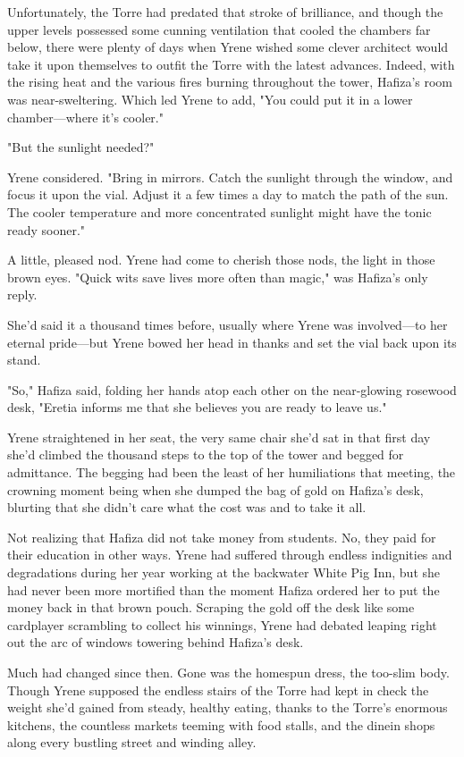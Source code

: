 Unfortunately, the Torre had predated that stroke of brilliance, and though the upper levels possessed some cunning ventilation that cooled the chambers far below, there were plenty of days when Yrene wished some clever architect would take it upon themselves to outfit the Torre with the latest advances. Indeed, with the rising heat and the various fires burning throughout the tower, Hafiza's room was near-sweltering. Which led Yrene to add, "You could put it in a lower chamber---where it's cooler."

"But the sunlight needed?"

Yrene considered. "Bring in mirrors. Catch the sunlight through the window, and focus it upon the vial. Adjust it a few times a day to match the path of the sun. The cooler temperature and more concentrated sunlight might have the tonic ready sooner."

A little, pleased nod. Yrene had come to cherish those nods, the light in those brown eyes. "Quick wits save lives more often than magic," was Hafiza's only reply.

She'd said it a thousand times before, usually where Yrene was involved---to her eternal pride---but Yrene bowed her head in thanks and set the vial back upon its stand.

"So," Hafiza said, folding her hands atop each other on the near-glowing rosewood desk, "Eretia informs me that she believes you are ready to leave us."

Yrene straightened in her seat, the very same chair she'd sat in that first day she'd climbed the thousand steps to the top of the tower and begged for admittance. The begging had been the least of her humiliations that meeting, the crowning moment being when she dumped the bag of gold on Hafiza's desk, blurting that she didn't care what the cost was and to take it all.

Not realizing that Hafiza did not take money from students. No, they paid for their education in other ways. Yrene had suffered through endless indignities and degradations during her year working at the backwater White Pig Inn, but she had never been more mortified than the moment Hafiza ordered her to put the money back in that brown pouch. Scraping the gold off the desk like some cardplayer scrambling to collect his winnings, Yrene had debated leaping right out the arc of windows towering behind Hafiza's desk.

Much had changed since then. Gone was the homespun dress, the too-slim body. Though Yrene supposed the endless stairs of the Torre had kept in check the weight she'd gained from steady, healthy eating, thanks to the Torre's enormous kitchens, the countless markets teeming with food stalls, and the dinein shops along every bustling street and winding alley.

